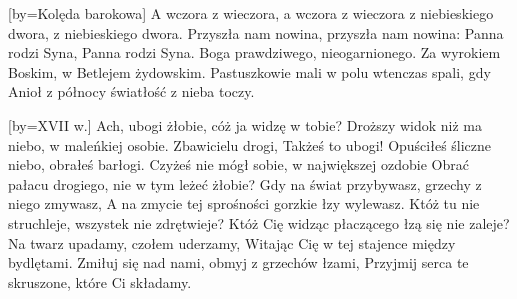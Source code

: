 
 [by={Kolęda barokowa}]
\beginverse
A wczora z wieczora, a wczora z wieczora
z niebieskiego dwora, z niebieskiego dwora.
Przyszła nam nowina, przyszła nam nowina:
Panna rodzi Syna, Panna rodzi Syna.
\endverse
\beginverse
Boga prawdziwego,
nieogarnionego.
Za wyrokiem Boskim,
w Betlejem żydowskim.
\endverse
\beginverse
Pastuszkowie mali
w polu wtenczas spali,
gdy Anioł z północy
światłość z nieba toczy.
\endverse
\endsong



[by={XVII w.}]
\beginverse
Ach, ubogi żłobie, cóż ja widzę w tobie?
Droższy widok niż ma niebo, w maleńkiej osobie. 
\endverse
\beginverse
Zbawicielu drogi, Takżeś to ubogi!
Opuściłeś śliczne niebo, obrałeś barłogi.
\endverse
\beginverse
Czyżeś nie mógł sobie, w największej ozdobie
Obrać pałacu drogiego, nie w tym leżeć żłobie?
\endverse
\beginverse
Gdy na świat przybywasz, grzechy z niego zmywasz,
A na zmycie tej sprośności gorzkie łzy wylewasz.
\endverse
\beginverse
Któż tu nie struchleje, wszystek nie zdrętwieje?
Któż Cię widząc płaczącego łzą się nie zaleje?
\endverse
\beginverse
Na twarz upadamy, czołem uderzamy,
Witając Cię w tej stajence między bydlętami.
\endverse
\beginverse
Zmiłuj się nad nami, obmyj z grzechów łzami,
Przyjmij serca te skruszone, które Ci składamy.
\endverse
\endsong


